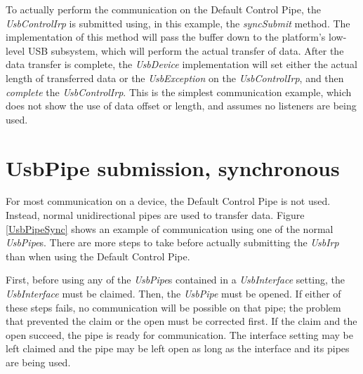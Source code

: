 \documentclass{article}
\newcommand{\myclass}[1]{\emph{#1}}
\newcommand{\myinterface}[1]{\emph{#1}}
\newcommand{\mymethod}[1]{\emph{#1}}
\newcommand{\mysectionend}[0]{\vfill\pagebreak[1]}
\begin{document}
To actually perform the communication on the Default Control Pipe, the
\myinterface{UsbControlIrp} is submitted using, in this example, the \mymethod{syncSubmit}
method.  The implementation of this method will pass the buffer down to the
platform's low-level USB subsystem, which will perform the actual transfer of
data.  After the data transfer is complete, the \myinterface{UsbDevice} implementation will
set either the actual length of transferred data or the \myclass{UsbException} on the
\myinterface{UsbControlIrp}, and then \mymethod{complete} the \myinterface{UsbControlIrp}.  This is the
simplest communication example, which does not show the use of data offset or
length, and assumes no listeners are being used.

\begin{figure}
\label{DCP}
\end{figure}

\mysectionend

%

\section{UsbPipe submission, synchronous}

For most communication on a device, the Default Control Pipe is not used.
Instead, normal unidirectional pipes are used to transfer data.  Figure
\ref{UsbPipeSync} shows an example of communication using one of the normal
\myinterface{UsbPipe}s.  There are more steps to take before actually submitting the \myinterface{UsbIrp}
than when using the Default Control Pipe.

First, before using any of the \myinterface{UsbPipe}s contained in a \myinterface{UsbInterface} setting,
the \myinterface{UsbInterface} must be claimed.  Then, the \myinterface{UsbPipe} must be opened.  If either
of these steps fails, no communication will be possible on that pipe; the
problem that prevented the claim or the open must be corrected first.  If the
claim and the open succeed, the pipe is ready for communication.  The interface
setting may be left claimed and the pipe may be left open as long as the
interface and its pipes are being used.
\end{document}
